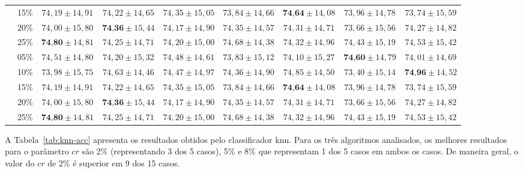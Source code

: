 \begin{table}[h]
{\begin{tabular}{|c|c|c|c|c|c|c|c|c|}
                 & 15\% & $74,19 \pm 14,91$ & $74,22 \pm 14,65$ & $74,35 \pm 15,05$ & $73,84 \pm 14,66$ & $\textbf{74,64} \pm 14,08$ & $73,96 \pm 14,78$ & $73,74 \pm 15,59$ \\ \cline{2-9}
                 & 20\% & $74,00 \pm 15,80$ & $\textbf{74,36} \pm 15,44$ & $74,17 \pm 14,90$ & $74,35 \pm 14,57$ & $74,31 \pm 14,71$ & $73,66 \pm 15,56$ & $74,27 \pm 14,82$ \\ \cline{2-9}
                 & 25\% & $\textbf{74,80} \pm 14,81$ & $74,25 \pm 14,71$ & $74,20 \pm 15,00$ & $74,68 \pm 14,38$ & $74,32 \pm 14,96$ & $74,43 \pm 15,19$ & $74,53 \pm 15,42$ \\ \hline
                \parbox[t]{3mm}{}
                 & 05\% & $74,51 \pm 14,80$ & $74,20 \pm 15,32$ & $74,48 \pm 14,61$ & $73,83 \pm 15,12$ & $74,10 \pm 15,27$ & $\textbf{74,60} \pm 14,79$ & $74,01 \pm 14,69$ \\ 
                 & 10\% & $73,98 \pm 15,75$ & $74,63 \pm 14,46$ & $74,47 \pm 14,97$ & $74,36 \pm 14,90$ & $74,85 \pm 14,50$ & $73,40 \pm 15,14$ & $\textbf{74,96} \pm 14,52$ \\ 
                 & 15\% & $74,19 \pm 14,91$ & $74,22 \pm 14,65$ & $74,35 \pm 15,05$ & $73,84 \pm 14,66$ & $\textbf{74,64} \pm 14,08$ & $73,96 \pm 14,78$ & $73,74 \pm 15,59$ \\ 
                 & 20\% & $74,00 \pm 15,80$ & $\textbf{74,36} \pm 15,44$ & $74,17 \pm 14,90$ & $74,35 \pm 14,57$ & $74,31 \pm 14,71$ & $73,66 \pm 15,56$ & $74,27 \pm 14,82$ \\ 
                 & 25\% & $\textbf{74,80} \pm 14,81$ & $74,25 \pm 14,71$ & $74,20 \pm 15,00$ & $74,68 \pm 14,38$ & $74,32 \pm 14,96$ & $74,43 \pm 15,19$ & $74,53 \pm 15,42$ \\ \hline
            \end{tabular}%
        }
        \label{tab:ripper-acc}
    \end{table}
    
    A Tabela~\ref{tab:knn-acc} apresenta os resultados obtidos pelo classificador \ac{knn}. Para os três algoritmos analisados, os melhores resultados para o parâmetro $cr$ são 2\% (representando 3 dos 5 casos), 5\% e 8\% que representam 1 dos 5 casos em ambos os casos. De maneira geral, o valor do $cr$ de 2\% é superior em 9 dos 15 casos. 
    
